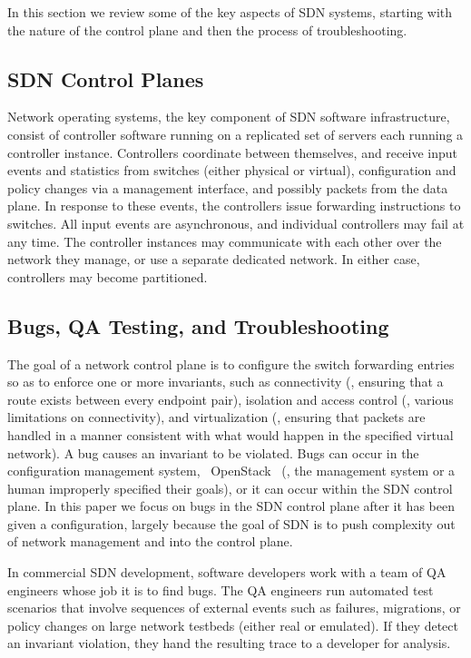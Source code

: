 In this section we review some of the key aspects of SDN systems, starting with the nature of the control plane and then the process of troubleshooting.

\subsection{SDN Control Planes}
Network operating systems, the key component of SDN software
infrastructure, consist of controller software running on a replicated set of
servers each running a controller instance. Controllers coordinate between
themselves, and receive input events and
statistics from switches (either physical or virtual), configuration and
policy changes via a management interface, and possibly packets from the data
plane. In response to these events, the
controllers issue forwarding instructions to switches. All input
events are asynchronous, and individual controllers may fail at any
time. The controller instances may communicate
with each other over the network they manage, or use a separate dedicated
network. In either case, controllers may become partitioned.

\subsection{Bugs, QA Testing, and Troubleshooting}
The goal of a network control plane is to configure the switch forwarding entries so as to
enforce one or more invariants, such as connectivity (\ie, ensuring that a
route exists between every endpoint pair), isolation and access control (\ie, various limitations on
connectivity), and virtualization (\ie, ensuring that packets are handled
in a manner consistent with what would happen in the specified virtual
network). A bug causes an invariant to be violated. Bugs can occur in the
configuration management system, \eg~OpenStack~\cite{quantum} (\ie, the
management system or a human improperly specified their goals), or it
can occur within the SDN control plane. In this paper we focus on bugs in the
SDN control plane after it has been given a configuration,
largely because the goal of SDN is to push complexity out of network management
and into the control plane.

In commercial SDN development, software developers work with a team of QA engineers whose
job it is to find bugs. The QA engineers run automated test scenarios that involve
sequences of external events such as failures, migrations, or policy changes
on large network testbeds (either real or emulated).
If they detect an invariant violation, they hand the resulting trace to a developer for analysis.

